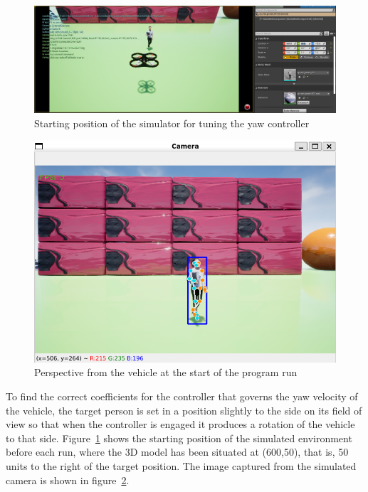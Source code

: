 \begin{figure}
  \centering
  \includegraphics[width=\textwidth, keepaspectratio]{img/4.1-tune/sim_window_tune.png}
  \caption{Starting position of the simulator for tuning the yaw controller}\label{fig:sim_window_tune}
\end{figure}

\begin{figure}
  \centering
  \includegraphics[width=.5\textwidth, keepaspectratio]{img/4.1-tune/yaw_tune_start_pos.png}
  \caption{Perspective from the vehicle at the start of the program run}\label{fig:sim_camera_tune}
\end{figure}

To find the correct coefficients for the controller that governs the yaw velocity of the vehicle, the target person is set in a position slightly to the side on its field of view so that when the controller is engaged it produces a rotation of the vehicle to that side.
Figure~\ref{fig:sim_window_tune} shows the starting position of the simulated environment before each run, where the 3D model has been situated at (600,50), that is, 50 units to the right of the target position.
The image captured from the simulated camera is shown in figure~\ref{fig:sim_camera_tune}.

